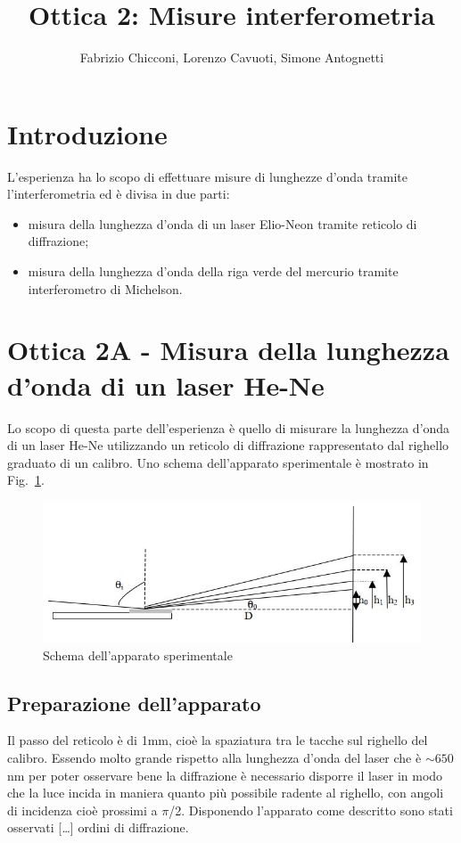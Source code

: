 \documentclass[10pt,a4paper]{article}
\title{Ottica 2: Misure interferometria}
\author{Fabrizio Chicconi, Lorenzo Cavuoti, Simone Antognetti}
\newcommand{\rem}[1]{[\emph{#1}]}
\begin{document}
 \maketitle 
 
\section*{Introduzione}
 L'esperienza ha lo scopo di effettuare misure di lunghezze d'onda tramite l'interferometria ed è divisa in due parti:
 \begin{itemize}
 \item misura della lunghezza d'onda di un laser Elio-Neon tramite reticolo di diffrazione;
 \item misura della lunghezza d'onda della riga verde del mercurio tramite interferometro di Michelson.
 \end{itemize}
 
 \section*{Ottica 2A - Misura della lunghezza d'onda di un laser He-Ne}
 Lo scopo di questa parte dell'esperienza è quello di misurare la lunghezza d'onda di un laser He-Ne utilizzando un reticolo di diffrazione rappresentato dal righello graduato di un calibro. Uno schema dell'apparato sperimentale è mostrato in Fig.~\ref{fig:diff}.
 \begin{figure}[h]
 	\centering
 	\includegraphics[scale=0.8]{calibro}
 	\caption{Schema dell'apparato sperimentale}
 	\label{fig:diff}
\end{figure}
\subsection*{Preparazione dell'apparato}
 Il passo del reticolo è di 1mm, cioè la spaziatura tra le tacche sul righello del calibro. Essendo molto grande rispetto alla lunghezza d'onda del laser che è $\sim650$ nm per poter osservare bene la diffrazione è necessario disporre il laser in modo che la luce incida in maniera quanto più possibile radente al righello, con angoli di incidenza cioè prossimi a $\pi$/2. Disponendo l'apparato come descritto sono stati osservati \rem{\dots} ordini di diffrazione.
\end{document}
